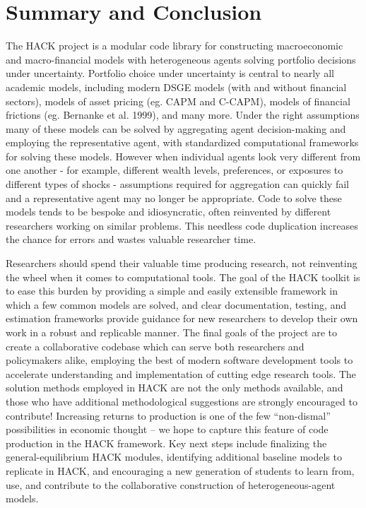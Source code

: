 \documentclass[]{article}
\begin{document}
\section{Summary and Conclusion}\label{summary-and-conclusion}

The HACK project is a modular code library for constructing
macroeconomic and macro-financial models with heterogeneous agents
solving portfolio decisions under uncertainty. Portfolio choice under
uncertainty is central to nearly all academic models, including modern
DSGE models (with and without financial sectors), models of asset
pricing (eg. CAPM and C-CAPM), models of financial frictions (eg.
Bernanke et al. 1999), and many more. Under the right assumptions many
of these models can be solved by aggregating agent decision-making and
employing the representative agent, with standardized computational
frameworks for solving these models. However when individual agents look
very different from one another - for example, different wealth levels,
preferences, or exposures to different types of shocks - assumptions
required for aggregation can quickly fail and a representative agent may
no longer be appropriate. Code to solve these models tends to be bespoke
and idiosyncratic, often reinvented by different researchers working on
similar problems. This needless code duplication increases the chance
for errors and wastes valuable researcher time.

Researchers should spend their valuable time producing research, not
reinventing the wheel when it comes to computational tools. The goal of
the HACK toolkit is to ease this burden by providing a simple and easily
extensible framework in which a few common models are solved, and clear
documentation, testing, and estimation frameworks provide guidance for
new researchers to develop their own work in a robust and replicable
manner. The final goals of the project are to create a collaborative
codebase which can serve both researchers and policymakers alike,
employing the best of modern software development tools to accelerate
understanding and implementation of cutting edge research tools. The
solution methods employed in HACK are not the only methods available,
and those who have additional methodological suggestions are strongly
encouraged to contribute! Increasing returns to production is one of the
few ``non-dismal'' possibilities in economic thought -- we hope to
capture this feature of code production in the HACK framework. Key next
steps include finalizing the general-equilibrium HACK modules,
identifying additional baseline models to replicate in HACK, and
encouraging a new generation of students to learn from, use, and
contribute to the collaborative construction of heterogeneous-agent
models.
\end{document}
